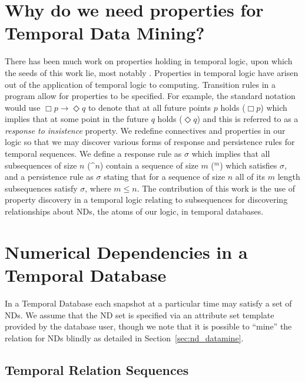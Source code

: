 \section{Why do we need properties for Temporal Data Mining?}\label{sec:tl_why}

There has been much work on properties holding in temporal logic, upon
which the seeds of this work lie, most notably \cite{mp92}. Properties
in temporal logic have arisen out of the application of temporal logic
to computing. Transition rules in a program allow for properties to be
specified. For example, the standard notation would use $\Box p \to
\Diamond q$ to denote that at all future points $p$ holds ($\Box p$)
which implies
that at some point in the future $q$ holds ($\Diamond q$) and this is
referred to as a
{\em response to insistence} property. We redefine connectives and
properties in
our logic so that we may discover various forms of response and
persistence rules for temporal sequences. We define a response rule as
 $\sigma$ which implies that all subsequences
of size $n$ ($\bm^n$) contain a sequence of size $m$ (\diam$^m$) which
satisfies $\sigma$, and a persistence rule as  $\sigma$  
stating that for a sequence of size $n$ all of its $m$ length subsequences
satisfy $\sigma$, where $m \le n$.
The contribution of this work is the use of property discovery in a
temporal logic relating to subsequences for discovering relationships
about NDs, the atoms of our logic, in temporal databases.
	
\section{Numerical Dependencies in a Temporal Database}\label{sec:tl_nd}
In a Temporal Database each snapshot at a particular time may satisfy
a set of NDs. We assume that the ND set is specified via an attribute
set template provided by the database user, though we note that it is
possible to ``mine'' the relation for NDs blindly as detailed in Section~\ref{sec:nd_datamine}.

\subsection{Temporal Relation Sequences}\label{sec:tl_relations}


